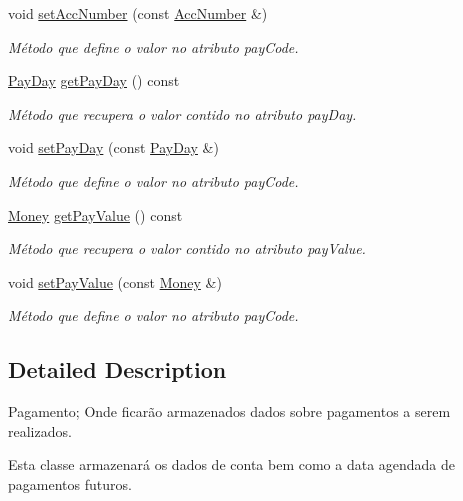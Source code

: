 \begin{DoxyCompactItemize}
void \hyperlink{classPayment_a5d0e83f83f090acf4b33bc81f5391ca0}{set\-Acc\-Number} (const \hyperlink{classAccNumber}{Acc\-Number} \&)
\begin{DoxyCompactList}\small\item\em Método que define o valor no atributo pay\-Code. \end{DoxyCompactList}\item 
\hyperlink{classPayDay}{Pay\-Day} \hyperlink{classPayment_a22ee22d04f3f5757f115386aa3337c51}{get\-Pay\-Day} () const 
\begin{DoxyCompactList}\small\item\em Método que recupera o valor contido no atributo pay\-Day. \end{DoxyCompactList}\item 
void \hyperlink{classPayment_aaadd94e11ab24629d536809da691efc5}{set\-Pay\-Day} (const \hyperlink{classPayDay}{Pay\-Day} \&)
\begin{DoxyCompactList}\small\item\em Método que define o valor no atributo pay\-Code. \end{DoxyCompactList}\item 
\hyperlink{classMoney}{Money} \hyperlink{classPayment_a3a2d6a8dc3f6b63e924504e1994ae556}{get\-Pay\-Value} () const 
\begin{DoxyCompactList}\small\item\em Método que recupera o valor contido no atributo pay\-Value. \end{DoxyCompactList}\item 
void \hyperlink{classPayment_ace63ad77804d5a19ace50aa1a7335050}{set\-Pay\-Value} (const \hyperlink{classMoney}{Money} \&)
\begin{DoxyCompactList}\small\item\em Método que define o valor no atributo pay\-Code. \end{DoxyCompactList}\end{DoxyCompactItemize}


\subsection{Detailed Description}
Pagamento; Onde ficarão armazenados dados sobre pagamentos a serem realizados. 

Esta classe armazenará os dados de conta bem como a data agendada de pagamentos futuros. 

